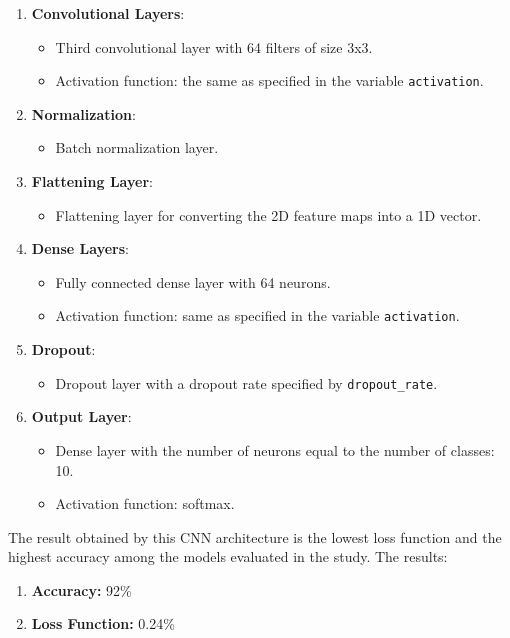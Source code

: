 \documentclass{article}
\begin{document}
\begin{enumerate}
    \item \textbf{Convolutional Layers}:
          \begin{itemize}
              \item Third convolutional layer with 64 filters of size 3x3.
              \item Activation function: the same as specified in the variable \texttt{activation}.
          \end{itemize}

    \item \textbf{Normalization}:
          \begin{itemize}
              \item Batch normalization layer.
          \end{itemize}

    \item \textbf{Flattening Layer}:
          \begin{itemize}
              \item Flattening layer for converting the 2D feature maps into a 1D vector.
          \end{itemize}

    \item \textbf{Dense Layers}:
          \begin{itemize}
              \item Fully connected dense layer with 64 neurons.
              \item Activation function: same as specified in the variable \texttt{activation}.
          \end{itemize}

    \item \textbf{Dropout}:
          \begin{itemize}
              \item Dropout layer with a dropout rate specified by \texttt{dropout\_rate}.
          \end{itemize}

    \item \textbf{Output Layer}:
          \begin{itemize}
              \item Dense layer with the number of neurons equal to the number of classes: 10.
              \item Activation function: softmax.
          \end{itemize}
\end{enumerate}

The result obtained by this CNN architecture is the lowest loss function and the highest accuracy among the models evaluated in the study.
The results:
\begin{enumerate}
    \item \textbf{Accuracy: } 92\%

    \item \textbf{Loss Function: } 0.24\%

\end{enumerate}
\end{document}
